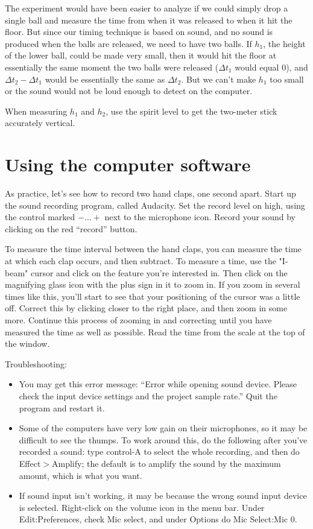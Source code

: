The experiment would have been easier to analyze if we could
simply drop a single ball and measure the time from when it
was released to when it hit the floor.  But since our timing
technique is based on sound, and no sound is produced when
the balls are released, we need to have two balls.  If
$h_1$, the height of the lower ball, could be made very
small, then it would hit the floor at essentially the same
moment the two balls were released ($\Delta t_1$ would equal 0),
and $\Delta t_2-\Delta t_1$ would be essentially the same as $\Delta t_2$.  But
we can't make $h_1$ too small or the sound would not be loud
enough to detect on the computer.

When measuring $h_1$ and $h_2$, use the spirit level to get the
two-meter stick accurately vertical.

\section*{Using the computer software}

As practice, let's see how to record two hand claps, one second apart.
Start up the sound recording program, called Audacity.
Set the record level on high, using the control marked $-\ldots +$ next to
the microphone icon. Record your sound by clicking on the red ``record'' button.


To measure the time interval between the hand claps, you can measure the time at which
each clap occurs, and then subtract. To measure a time, 
use the "I-beam" cursor and click on the feature you're interested in.
Then click on the magnifying glass icon with the plus sign in it to zoom in.
If you zoom in several times like this, you'll start to see that your positioning
of the cursor was a little off. Correct this by clicking closer to the right place,
and then zoom in some more. Continue this process of zooming in and correcting
until you have measured the time as well as possible.
Read the time from the scale at the top of the window.

Troubleshooting:
\begin{itemize}
\item[] You may get this error message: ``Error while opening sound device. Please check the input device settings and the project sample rate.''
Quit the program and restart it.

\item[] Some of the computers have very low gain on their microphones, so it may be difficult to see the thumps. To work around
this, do the following after you've recorded a sound: type control-A to select the whole recording,
and then do Effect$>$Amplify; the default is to amplify the sound by the maximum amount, which is what you want.

\item[] If sound input isn't working, it may be because the wrong sound input device is selected. Right-click on the volume icon
in the menu bar. Under Edit:Preferences, check Mic select, and under Options do Mic Select:Mic 0.
\end{itemize}

